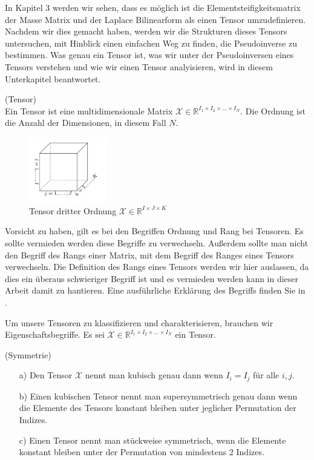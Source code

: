In Kapitel 3 werden wir sehen, dass es möglich ist die Elementsteifigkeitsmatrix der Masse Matrix und der Laplace Bilinearform als einen Tensor umzudefinieren. Nachdem wir dies gemacht haben, werden wir die Strukturen dieses Tensors untersuchen, mit Hinblick einen einfachen Weg zu finden, die Pseudoinverse zu bestimmen. Was genau ein Tensor ist, was wir unter der Pseudoinversen eines Tensors verstehen und wie wir einen Tensor analyisieren, wird in diesem Unterkapitel beantwortet.


\begin{Definition} (Tensor) \\
Ein Tensor ist eine multidimensionale Matrix $\pmb{\mathscr{X}}  \in \mathbb{R}^{I_1 \times I_2 \times \dots \times I_N}$.
Die Ordnung ist die Anzahl der Dimensionen, in diesem Fall $N$. 
\end{Definition}

\begin{figure}[ht]
	\centering
  \includegraphics[width=0.3\textwidth]{tensorOrdnung3.png}
	\caption{Tensor dritter Ordnung $\pmb{\mathscr{X}}  \in \mathbb{R}^{I \times J \times K}$ \cite[456]{Kolda}}
	\label{fig:tensorOrdnung3}
\end{figure}

Vorsicht zu haben, gilt es bei den Begriffen Ordnung und Rang bei Tensoren. Es sollte vermieden werden diese Begriffe zu verwechseln. Außerdem sollte man nicht den Begriff des Rangs einer Matrix, mit dem Begriff des Ranges eines Tensors verwechseln. Die Definition des Rangs eines Tensors werden wir hier auslassen, da dies ein überaus schwieriger Begriff ist und es vermieden werden kann in dieser Arbeit damit zu hantieren. Eine ausführliche Erklärung des Begriffs finden Sie in \cite[464]{Kolda}.

\newpage

Um unsere Tensoren zu klassifizieren und charakterisieren, brauchen wir Eigenschaftsbegriffe. Es sei $\pmb{\mathscr{X}}  \in \mathbb{R}^{I_1 \times I_2 \times \dots \times I_N}$ ein Tensor.
\begin{Definition} (Symmetrie)
\begin{itemize}
\item[a)] Den Tensor $\pmb{\mathscr{X}}$ nennt man kubisch genau dann wenn $I_i = I_j$ für alle $i,j$.
\item[b)] Einen kubischen Tensor nennt man supersymmetrisch genau dann wenn die Elemente des Tensors konstant bleiben unter jeglicher Permutation der Indizes.
\item[c)] Einen Tensor nennt man stückweise symmetrisch, wenn die Elemente konstant bleiben unter der Permutation von mindestens 2 Indizes.
\end{itemize}
\end{Definition}

